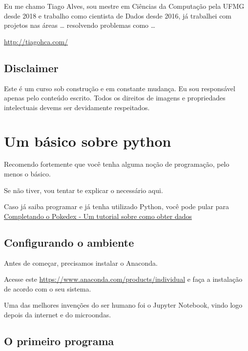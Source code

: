 \documentclass[]{book}
\begin{document}
Eu me chamo Tiago Alves, sou mestre em Ciências da Computação pela UFMG desde 2018 e trabalho como
cientista de Dados desde 2016, já trabalhei com projetos nas áreas \ldots{} resolvendo problemas como \ldots{}

\url{http://tiagohca.com/}

\hypertarget{disclaimer}{%
\section{Disclaimer}\label{disclaimer}}

Este é um curso sob construção e em constante mudança. Eu sou responsável apenas pelo conteúdo escrito. Todos os direitos de imagens e propriedades intelectuais devems ser devidamente respeitados.

\hypertarget{um-buxe1sico-sobre-python}{%
\chapter{Um básico sobre python}\label{um-buxe1sico-sobre-python}}

Recomendo fortemente que você tenha alguma noção de programação, pelo menos o básico.

Se não tiver, vou tentar te explicar o necessário aqui.

Caso já saiba programar e já tenha utilizado Python, você pode pular para \protect\hyperlink{completando-o-pokedex---um-tutorial-sobre-como-obter-dados}{Completando o Pokedex - Um tutorial sobre como obter dados}

\hypertarget{configurando-o-ambiente}{%
\section{Configurando o ambiente}\label{configurando-o-ambiente}}

Antes de começar, precisamos instalar o Anaconda.

Acesse este \href{link}{https://www.anaconda.com/products/individual} e faça a instalação de acordo com o seu sistema.

Uma das melhores invenções do ser humano foi o Jupyter Notebook, vindo logo depois da internet e do microondas.

\hypertarget{o-primeiro-programa}{%
\section{O primeiro programa}\label{o-primeiro-programa}}
\end{document}

